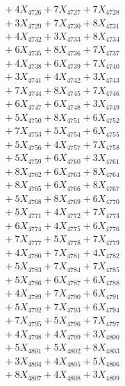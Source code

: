 \documentclass[a4paper,10pt]{article}
\begin{document}
{\begin{align}
&\;  + 4 X_{4726} + 7 X_{4727} + 7 X_{4728} \\[0.3ex]
&\;  + 3 X_{4729} + 7 X_{4730} + 8 X_{4731} \\[0.3ex]
&\;  + 4 X_{4732} + 3 X_{4733} + 8 X_{4734} \\[0.3ex]
&\;  + 6 X_{4735} + 8 X_{4736} + 7 X_{4737} \\[0.3ex]
&\;  + 4 X_{4738} + 6 X_{4739} + 7 X_{4740} \\[0.3ex]
&\;  + 3 X_{4741} + 4 X_{4742} + 3 X_{4743} \\[0.3ex]
&\;  + 7 X_{4744} + 8 X_{4745} + 7 X_{4746} \\[0.3ex]
&\;  + 6 X_{4747} + 6 X_{4748} + 3 X_{4749} \\[0.5ex]\allowbreak
&\;  + 5 X_{4750} + 8 X_{4751} + 6 X_{4752} \\[0.3ex]
&\;  + 7 X_{4753} + 5 X_{4754} + 6 X_{4755} \\[0.3ex]
&\;  + 5 X_{4756} + 4 X_{4757} + 7 X_{4758} \\[0.3ex]
&\;  + 5 X_{4759} + 6 X_{4760} + 3 X_{4761} \\[0.3ex]
&\;  + 8 X_{4762} + 6 X_{4763} + 8 X_{4764} \\[0.3ex]
&\;  + 8 X_{4765} + 6 X_{4766} + 8 X_{4767} \\[0.3ex]
&\;  + 5 X_{4768} + 8 X_{4769} + 6 X_{4770} \\[0.3ex]
&\;  + 5 X_{4771} + 4 X_{4772} + 7 X_{4773} \\[0.3ex]
&\;  + 6 X_{4774} + 4 X_{4775} + 6 X_{4776} \\[0.3ex]
&\;  + 7 X_{4777} + 5 X_{4778} + 7 X_{4779} \\[0.5ex]\allowbreak
&\;  + 4 X_{4780} + 7 X_{4781} + 4 X_{4782} \\[0.3ex]
&\;  + 5 X_{4783} + 7 X_{4784} + 7 X_{4785} \\[0.3ex]
&\;  + 5 X_{4786} + 6 X_{4787} + 6 X_{4788} \\[0.3ex]
&\;  + 4 X_{4789} + 7 X_{4790} + 6 X_{4791} \\[0.3ex]
&\;  + 5 X_{4792} + 7 X_{4793} + 6 X_{4794} \\[0.3ex]
&\;  + 7 X_{4795} + 5 X_{4796} + 7 X_{4797} \\[0.3ex]
&\;  + 4 X_{4798} + 4 X_{4799} + 3 X_{4800} \\[0.3ex]
&\;  + 5 X_{4801} + 5 X_{4802} + 8 X_{4803} \\[0.3ex]
&\;  + 3 X_{4804} + 4 X_{4805} + 5 X_{4806} \\[0.3ex]
&\;  + 8 X_{4807} + 4 X_{4808} + 3 X_{4809} \\[0.5ex]\allowbreak

\end{align}}
\end{document}
